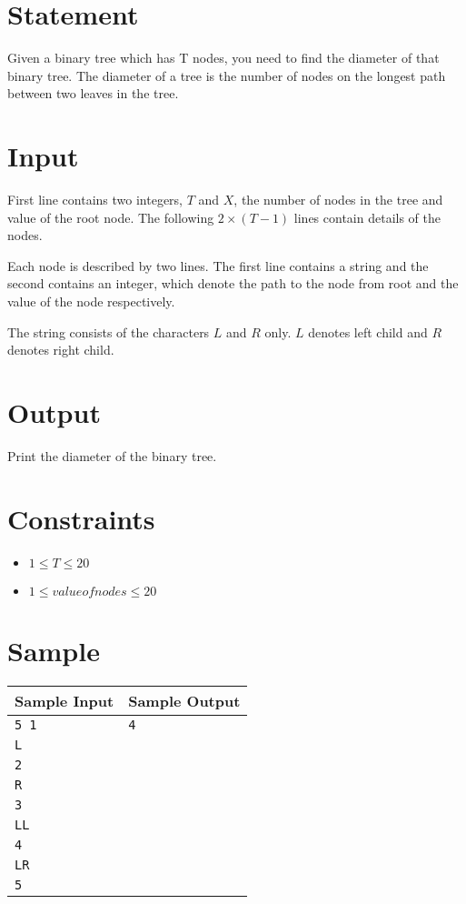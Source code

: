 \documentclass{article}
\begin{document}
\section*{Statement}

Given a binary tree which has T nodes, you need to find the diameter of that binary tree. The diameter of a tree is the number of nodes on the longest path between two leaves in the tree.

\section*{Input}

First line contains two integers, $T$ and $X$, the number of nodes in the tree and value of the root node. The following $2 \times (T - 1)$ lines contain details of the nodes.

Each node is described by two lines. The first line contains a string and the second contains an integer, which denote the path to the node from root and the value of the node respectively.

The string consists of the characters $L$ and $R$ only. $L$ denotes left child and $R$ denotes right child.

\section*{Output}

Print the diameter of the binary tree.

\section*{Constraints}

\begin{itemize}
    \item $1 \le T \le 20$
    \item $1 \le valueofnodes \le 20$
\end{itemize}

\section*{Sample}

\begin{tabular}{l|l}
    \hline
    \hline
    Sample Input & Sample Output \\
    \hline
    \verb+5 1+ & \verb+4+ \\
    \verb+L+ & \verb++ \\
    \verb+2+ & \verb++ \\
    \verb+R+ & \verb++ \\
    \verb+3+ & \verb++ \\
    \verb+LL+ & \verb++ \\
    \verb+4+ & \verb++ \\
    \verb+LR+ & \verb++ \\
    \verb+5+ & \verb++ \\
    \hline
\end{tabular}
\end{document}
